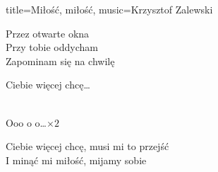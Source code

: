 \begin{song}{title={Miłość, miłość}, music={Krzysztof Zalewski}}
\begin{multicols}{2}
\begin{verse*}
        Przez otwarte okna \\
        Przy tobie oddycham \\
        Zapominam się na chwilę
    \end{verse*}
    \begin{chorus}
        Ciebie więcej chcę\ldots
    \end{chorus}
    \begin{interlude}
            \\
        Ooo o o\ldots $\times 2$
    \end{interlude}
    \begin{chorus}
        Ciebie więcej chcę, musi mi to przejść \\
        I minąć mi miłość, mijamy sobie
    \end{chorus}
    \begin{chorus*}
           
    \end{chorus*}
    \end{multicols}
\end{song}

